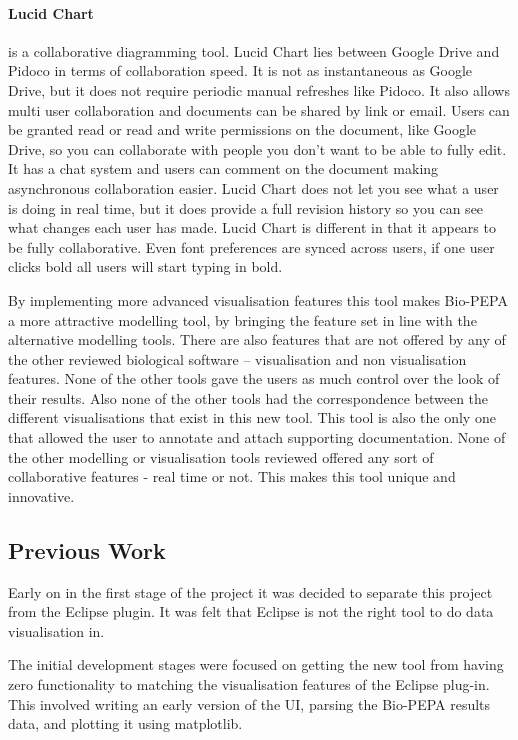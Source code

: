 \paragraph{Lucid Chart} is a collaborative diagramming tool.  Lucid Chart lies between Google Drive and Pidoco in terms of collaboration speed.  It is not as instantaneous as Google Drive, but it does not require periodic manual refreshes like Pidoco.  It also allows multi user collaboration and documents can be shared by link or email.  Users can be granted read or read and write permissions on the document, like Google Drive, so you can collaborate with people you don't want to be able to fully edit.  It has a chat system and users can comment on the document making asynchronous collaboration easier.  Lucid Chart does not let you see what a user is doing in real time, but it does provide a full revision history so you can see what changes each user has made.  Lucid Chart is different in that it appears to be fully collaborative. Even font preferences are synced across users, if one user clicks bold all users will start typing in bold.

By implementing more advanced visualisation features this tool makes Bio-PEPA a more attractive modelling tool, by bringing the feature set in line with the alternative modelling tools.  There are also features that are not offered by any of the other reviewed biological software -- visualisation and non visualisation features.  None of the other tools gave the users as much control over the look of their results.  Also none of the other tools had the correspondence between the different visualisations that exist in this new tool.  This tool is also the only one that allowed the user to annotate and attach supporting documentation.  None of the other modelling or visualisation tools reviewed offered any sort of collaborative features - real time or not.  This makes this tool unique and innovative.

\subsection{Previous Work}

Early on in the first stage of the project it was decided to separate this project from the Eclipse plugin.  It was felt that Eclipse is not the right tool to do data visualisation in.

The initial development stages were focused on getting the new tool from having zero functionality to matching the visualisation features of the Eclipse plug-in.  This involved writing an early version of the \ac{UI}, parsing the Bio-PEPA results data, and plotting it using matplotlib.

